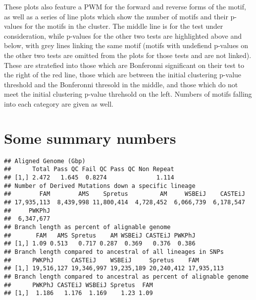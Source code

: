 \documentclass{article}\usepackage[]{graphicx}\usepackage[]{color}
\makeatletter
\newenvironment{kframe}{%
 \def\at@end@of@kframe{}%
 \ifinner\ifhmode%
  \def\at@end@of@kframe{\end{minipage}}%
  \begin{minipage}{\columnwidth}%
 \fi\fi%
 \def\FrameCommand##1{\hskip\@totalleftmargin \hskip-\fboxsep
 \colorbox{shadecolor}{##1}\hskip-\fboxsep
     \hskip-\linewidth \hskip-\@totalleftmargin \hskip\columnwidth}%
 \MakeFramed {\advance\hsize-\width
   \@totalleftmargin\z@ \linewidth\hsize
   \@setminipage}}%
 {\par\unskip\endMakeFramed%
 \at@end@of@kframe}
\newenvironment{knitrout}{}{} %
\makeatother
\begin{document}
These plots also feature a PWM for the forward and reverse forms of the motif, as well as a series of line plots which show the number of motifs and their p-values for the motifs in the cluster. The middle line is for the test under consideration, while p-values for the other two tests are highlighted above and below, with grey lines linking the same motif (motifs with undefiend p-values on the other two tests are omitted from the plots for those tests and are not linked). These are stratefied into those which are Bonferonni significant on their test to the right of the red line, those which are between the initial clustering p-value threshold and the Bonferonni thresold in the middle, and those which do not meet the initial clustering p-value threhsold on the left. Numbers of motifs falling into each category are given as well.



\section*{Some summary numbers}
\begin{knitrout}
\color{fgcolor}\begin{kframe}
\begin{verbatim}
## Aligned Genome (Gbp)
##      Total Pass QC Fail QC Pass QC Non Repeat
## [1,] 2.472   1.645  0.8274              1.114
## Number of Derived Mutations down a specific lineage
##        FAM        AMS    Spretus         AM     WSBEiJ    CASTEiJ 
## 17,935,113  8,439,998 11,800,414  4,728,452  6,066,739  6,178,547 
##     PWKPhJ 
##  6,347,677
## Branch length as percent of alignable genome
##       FAM   AMS Spretus    AM WSBEiJ CASTEiJ PWKPhJ
## [1,] 1.09 0.513   0.717 0.287  0.369   0.376  0.386
## Branch length compared to ancestral of all lineages in SNPs
##      PWKPhJ     CASTEiJ    WSBEiJ     Spretus    FAM       
## [1,] 19,516,127 19,346,997 19,235,189 20,240,412 17,935,113
## Branch length compared to ancestral as percent of alignable genome
##      PWKPhJ CASTEiJ WSBEiJ Spretus  FAM
## [1,]  1.186   1.176  1.169    1.23 1.09
\end{verbatim}
\end{kframe}
\end{knitrout}
\end{document}

